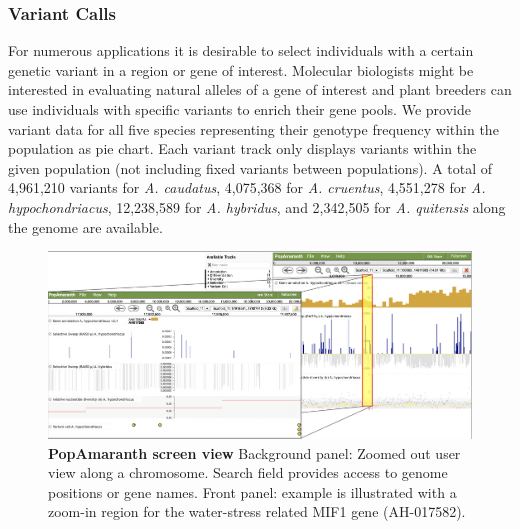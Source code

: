 \documentclass[9pt,twocolumn,twoside]{celabRxiv}
\begin{document}


\subsubsection{Variant Calls}
For numerous applications it is desirable to select individuals with a certain genetic variant in a region or gene of interest.
Molecular biologists might be interested in evaluating natural alleles of a gene of interest and plant breeders can use individuals with specific variants to enrich their gene pools.
We provide variant data for all five species representing their genotype frequency within the population as pie chart.
Each variant track only displays variants within the given population (not including fixed variants between populations). 
A total of 4,961,210 variants for \textit{A. caudatus}, 4,075,368 for \textit{A. cruentus}, 4,551,278 for \textit{A. hypochondriacus}, 12,238,589 for \textit{A. hybridus}, and 2,342,505 for \textit{A. quitensis} along the genome are available.
 
 

 
 
\begin{figure}[ht]
\includegraphics[width=1\linewidth]{figures/figure2_new.png}
\caption{\textbf{PopAmaranth screen view} Background panel: Zoomed out user view along a chromosome. Search field provides access to genome positions or gene names.  Front panel: example is illustrated with a zoom-in region for the water-stress related MIF1 gene (AH-017582).}
\label{fig:Pscreen}
\end{figure}
\end{document}
